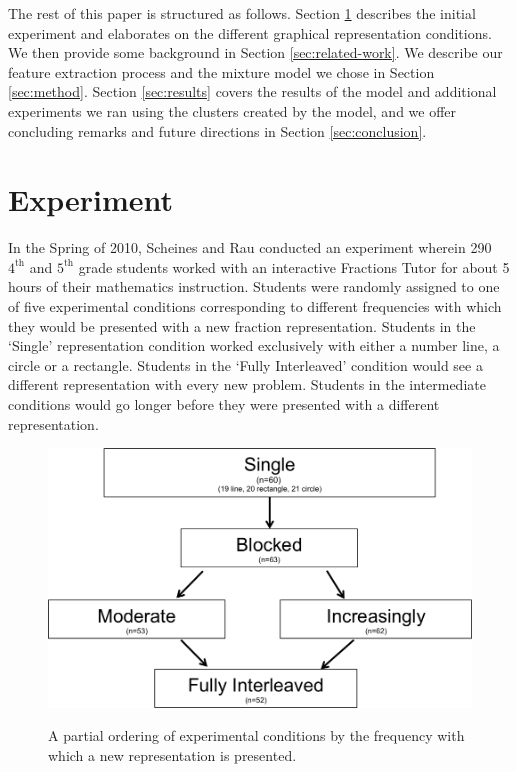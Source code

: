 \documentclass{edm_template}
\begin{document}
The rest of this paper is structured as follows. Section \ref{sec:experiment} describes the initial experiment and elaborates on the different graphical representation conditions. We then provide some background in Section \ref{sec:related-work}. We describe our feature extraction process and the mixture model we chose in Section \ref{sec:method}. Section \ref{sec:results} covers the results of the model and additional experiments we ran using the clusters created by the model, and we offer concluding remarks and future directions in Section \ref{sec:conclusion}.

\section{Experiment}
\label{sec:experiment}

In the Spring of 2010, Scheines and Rau conducted an experiment wherein 290 $4^\text{th}$ and $5^\text{th}$ grade students worked with an interactive Fractions Tutor for about 5 hours of their mathematics instruction. Students were randomly assigned to one of five experimental conditions corresponding to different frequencies with which they would be presented with a new fraction representation. Students in the `Single' representation condition worked exclusively with either a number line, a circle or a rectangle. Students in the `Fully Interleaved' condition would see a different representation with every new problem. Students in the intermediate conditions would go longer before they were presented with a different representation.   
\begin{figure}[htbp]
\centering
\includegraphics[scale=.4]{conditionGraph.png}\\
\caption{A partial ordering of experimental conditions by the frequency with which a new representation is presented. }
\label{fig:condition-graph}
\end{figure}
\end{document}
